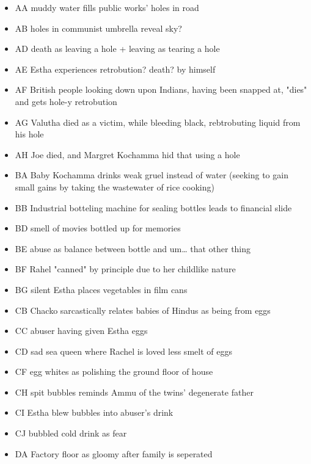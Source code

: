 \documentclass[letterpaper]{article}
\begin{document}
\begin{itemize}
\item AA muddy water fills public works' holes in road

\item AB holes in communist umbrella reveal sky?

\item AD death as leaving a hole + leaving as tearing a hole

\item AE Estha experiences retrobution? death? by himself

\item AF British people looking down upon Indians, having been snapped at,
"dies" and gets hole-y retrobution

\item AG Valutha died as a victim, while bleeding black, rebtrobuting liquid
from his hole

\item AH Joe died, and Margret Kochamma hid that using a hole

\item BA Baby Kochamma drinks weak gruel instead of water (seeking to gain
small gains by taking the wastewater of rice cooking)

\item BB Industrial botteling machine for sealing bottles leads to financial
slide

\item BD smell of movies bottled up for memories

\item BE abuse as balance between bottle and um\ldots{} that other thing

\item BF Rahel "canned" by principle due to her childlike nature

\item BG silent Estha places vegetables in film cans

\item CB Chacko sarcastically relates babies of Hindus as being from eggs

\item CC abuser having given Estha eggs

\item CD sad sea queen where Rachel is loved less smelt of eggs

\item CF egg whites as polishing the ground floor of house

\item CH spit bubbles reminds Ammu of the twins' degenerate father

\item CI Estha blew bubbles into abuser's drink

\item CJ bubbled cold drink as fear

\item DA Factory floor as gloomy after family is seperated
\end{itemize}
\end{document}
